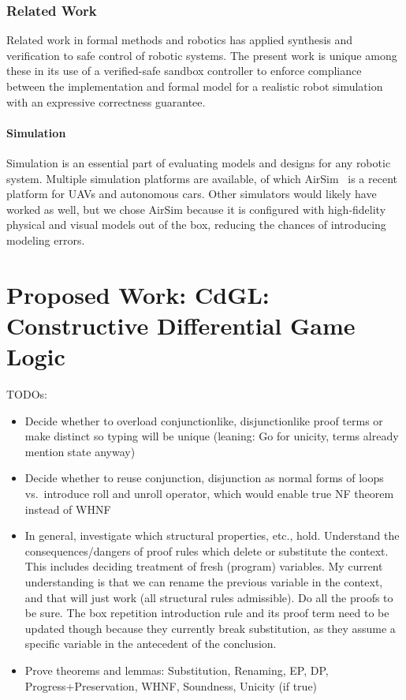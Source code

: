 \documentclass[12pt]{cmuthesis}
\theoremstyle{definition}
\theoremstyle{remark}
\newcommand{\CdGL}{\textsf{CdGL}\xspace}
\begin{document}
\subsection{Related Work}
Related work in formal methods and robotics has applied synthesis and verification to safe control of robotic systems.
The present work is unique among these in its use of a verified-safe sandbox controller to enforce compliance between the implementation and formal model for a realistic robot simulation with an expressive correctness guarantee.

\subsubsection{Simulation}
Simulation is an essential part of evaluating models and designs for any robotic system.
Multiple simulation platforms are available, of which AirSim~\cite{shah2018airsim} is a recent platform for UAVs and autonomous cars.
Other simulators would likely have worked as well, but we chose AirSim because it is configured with high-fidelity physical and visual models out of the box, reducing the chances of introducing modeling errors.

\chapter{Proposed Work: \CdGL: Constructive Differential Game Logic}
\label{ch:cdgl}
{\Huge TODOs}:
\begin{itemize}
\item Decide whether to overload conjunctionlike, disjunctionlike proof terms or make distinct so typing will be unique (leaning: Go for unicity, terms already mention state anyway)
\item Decide whether to reuse conjunction, disjunction as normal forms of loops vs.\ introduce roll and unroll operator, which would enable true NF theorem instead of 
WHNF
\item In general, investigate which structural properties, etc., hold. 
Understand the consequences/dangers of proof rules which delete or substitute the context.
This includes deciding treatment of fresh (program) variables.
My current understanding is that we can rename the previous variable in the context, and that will just work (all structural rules admissible).
Do all the proofs to be sure.
The box repetition introduction rule and its proof term need to be updated though because they currently break substitution, as they assume a specific variable in the antecedent of the conclusion.
\item Prove theorems and lemmas: Substitution, Renaming, EP, DP, Progress+Preservation, WHNF, Soundness, Unicity (if true)
\end{itemize}
\end{document}
